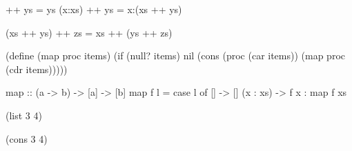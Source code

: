 \documentclass[UKenglish,usenames,dvipsnames,svgnames,table,aspectratio=169,mathserif]{beamer}
\newcommand{\nl}{\vspace{\baselineskip}}
\begin{document}
\begin{frame}[fragile]
\begin{haskellcode}
[] ++ ys      =  ys
(x:xs) ++ ys  =  x:(xs ++ ys)
\end{haskellcode}

\begin{haskellcode}
(xs ++ ys) ++ zs = xs ++ (ys ++ zs)
\end{haskellcode}
\end{frame}

\iffalse
\begin{frame}[fragile]
\begin{schemecode}
(define (map proc items)
  (if (null? items)
      nil
      (cons (proc (car items))
            (map proc (cdr items)))))
\end{schemecode}
\nl

\begin{haskellcode}
map :: (a -> b) -> [a] -> [b]
map f l =
  case l of
    []       -> []
    (x : xs) -> f x : map f xs
\end{haskellcode}
\end{frame}


\begin{frame}[fragile]
\LARGE
\begin{schemecode}
             (list 3 4)

             (cons 3 4)
\end{schemecode}
\end{frame}
\end{document}
